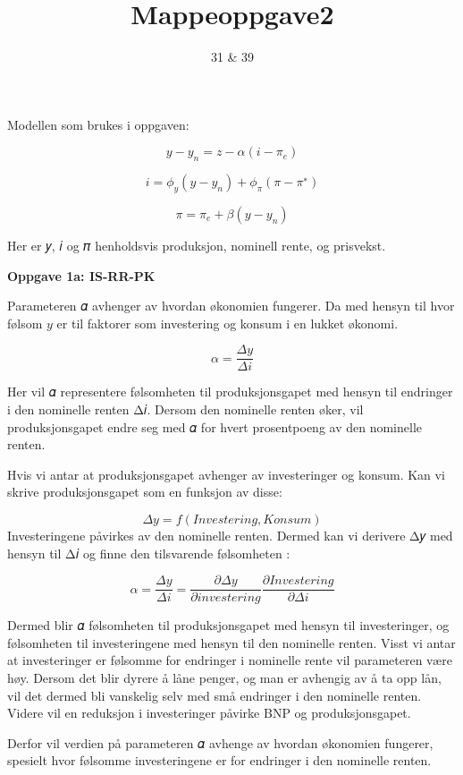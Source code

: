 \documentclass[
  letterpaper,
  DIV=11,
  numbers=noendperiod]{scrartcl}
\title{Mappeoppgave2}
\author{31 \& 39}
\date{}
\begin{document}
\maketitle
\ifdefined\Shaded\renewenvironment{Shaded}{\begin{tcolorbox}[sharp corners, borderline west={3pt}{0pt}{shadecolor}, interior hidden, frame hidden, boxrule=0pt, breakable, enhanced]}{\end{tcolorbox}}\fi

Modellen som brukes i oppgaven:

\[
𝑦− 𝑦_𝑛 = 𝑧 − 𝛼(𝑖 − 𝜋_𝑒)
\]

\[
𝑖 = 𝜙_𝑦(𝑦 − 𝑦_𝑛) + 𝜙_𝜋(𝜋 − 𝜋^∗)
\]

\[ 
𝜋 = 𝜋_𝑒 + 𝛽(𝑦 − 𝑦_𝑛) 
\]

Her er 𝑦, 𝑖 og 𝜋 henholdsvis produksjon, nominell rente, og prisvekst.

\textbf{Oppgave 1a: IS-RR-PK}

Parameteren 𝛼 avhenger av hvordan økonomien fungerer. Da med hensyn til
hvor følsom \(y\) er til faktorer som investering og konsum i en lukket
økonomi.

\[
𝛼 = \frac{𝛥y}{𝛥i}
\]

Her vil 𝛼 representere følsomheten til produksjonsgapet med hensyn til
endringer i den nominelle renten Δ𝑖. Dersom den nominelle renten øker,
vil produksjonsgapet endre seg med 𝛼 for hvert prosentpoeng av den
nominelle renten.

Hvis vi antar at produksjonsgapet avhenger av investeringer og konsum.
Kan vi skrive produksjonsgapet som en funksjon av disse:

\[
Δ𝑦 = f(Investering, Konsum) 
\]Investeringene påvirkes av den nominelle renten. Dermed kan vi
derivere Δ𝑦 med hensyn til Δ𝑖 og finne den tilsvarende følsomheten :

\[
𝛼 = \frac{Δ𝑦}{Δ𝑖} = \frac{∂Δ𝑦}{∂investering}\frac{∂Investering}{∂Δ𝑖}
\]

Dermed blir 𝛼 følsomheten til produksjonsgapet med hensyn til
investeringer, og følsomheten til investeringene med hensyn til den
nominelle renten. Visst vi antar at investeringer er følsomme for
endringer i nominelle rente vil parameteren være høy. Dersom det blir
dyrere å låne penger, og man er avhengig av å ta opp lån, vil det dermed
bli vanskelig selv med små endringer i den nominelle renten. Videre vil
en reduksjon i investeringer påvirke BNP og produksjonsgapet.

Derfor vil verdien på parameteren 𝛼 avhenge av hvordan økonomien
fungerer, spesielt hvor følsomme investeringene er for endringer i den
nominelle renten.
\end{document}
